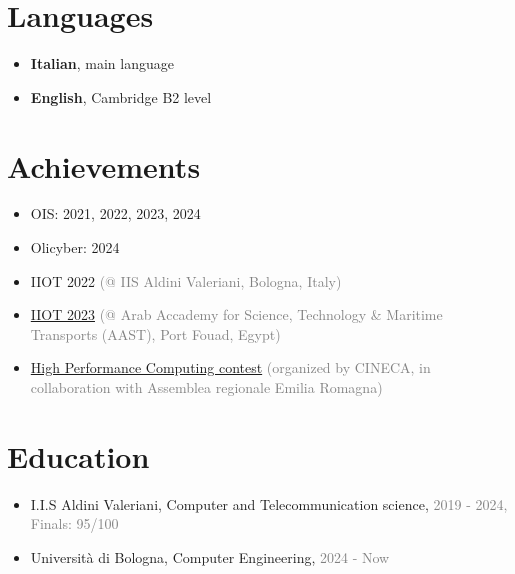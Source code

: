 \documentclass{paper}
\begin{document}
\section{Languages}

\begin{itemize}
    \item \textbf{Italian}, main language
    \item \textbf{English}, Cambridge B2 level
\end{itemize}

\section{Achievements}

\begin{itemize}
    \item OIS: 2021, 2022, 2023, 2024
    \item Olicyber: 2024

    \item IIOT 2022 \textcolor{gray}{(@ IIS Aldini Valeriani, Bologna, Italy)}
    \item \href{https://forum.olinfo.it/t/iiot-2023-diary/8278}{IIOT 2023} \textcolor{gray}{(@ Arab Accademy for Science, Technology \& Maritime Transports (AAST), Port Fouad, Egypt)}

    \item \href{https://www.ilrestodelcarlino.it/bologna/cronaca/sfida-tra-studenti-sul-supercalcolo-vincono-le-scuole-aldini-valeriani-8638a766}{High Performance Computing contest} \textcolor{gray}{(organized by CINECA, in collaboration with Assemblea regionale Emilia Romagna)}
\end{itemize}

\section{Education}

\begin{itemize}
    \item I.I.S Aldini Valeriani, Computer and Telecommunication science, \textcolor{gray}{2019 - 2024, Finals: 95/100}
    \item Università di Bologna, Computer Engineering, \textcolor{gray}{2024 - Now}
\end{itemize}
\end{document}
